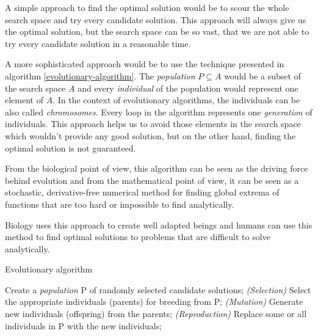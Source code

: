 A simple approach to find the optimal solution would be to scour the whole search space and try every candidate solution. This approach will always give us the optimal solution, but the search space can be so vast, that we are not able to try every candidate solution in a reasonable time.

A more sophisticated approach would be to use the technique presented in algorithm \ref{evolutionary-algorithm}. The \textit{population} $P \subseteq A$ would be a subset of the search space $A$ and every \textit{individual} of the population would represent one element of $A$. In the context of evolutionary algorithms, the individuals can be also called \textit{chromosomes}. Every loop in the algorithm represents one \textit{generation} of individuals. This approach helps us to avoid those elements in the search space which wouldn't provide any good solution, but on the other hand, finding the optimal solution is not guaranteed.

From the biological point of view, this algorithm can be seen as the driving force behind evolution and from the mathematical point of view, it can be seen as a stochastic, derivative-free numerical method for finding global extrema of functions that are too hard or impossible to find analytically.

Biology uses this approach to create well adapted beings and humans can use this method to find optimal solutions to problems that are difficult to solve analytically.

\begin{algorithm}
	\caption{Evolutionary algorithm \cite{natural-computing-algorithms}}
	\label{evolutionary-algorithm}
	\begin{algorithmic}[1]
		\State Create a \textit{population} P of randomly selected candidate solutions;
		\Repeat
		    \State \textit{(Selection)} Select the appropriate individuals (parents) for breeding from P;
		    \State \textit{(Mutation)} Generate new individuals (offspring) from the parents;
		    \State \textit{(Reproduction)} Replace some or all individuals in P with the new individuals;
	\end{algorithmic}
\end{algorithm}

